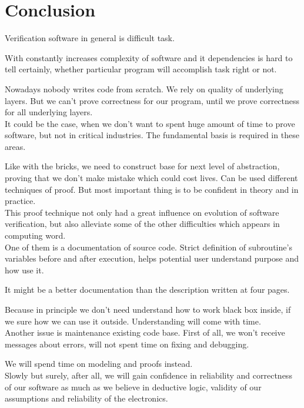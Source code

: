 \documentclass[twoside,twocolumn]{article}
\begin{document}

\section{Conclusion}

Verification software in general is difficult task.

With constantly increases complexity of software and it dependencies is hard to
tell certainly, whether particular program will accomplish task right or not. 

Nowadays nobody writes code from scratch. We rely on quality of underlying
layers. But we can't prove correctness for our program, until we prove
correctness for all underlying layers. \\

It could be the case, when we don't want to spent huge amount of time to prove
software, but not in critical industries. The fundamental basis is required in
these areas.

Like with the bricks, we need to construct base for next level of abstraction,
proving that we don't make mistake which could cost lives.
Can be used different techniques of proof. But most important thing is to be
confident in theory and in practice.
\\

This proof technique not only had a great influence on evolution of software
verification, but also alleviate some of the other difficulties which appears in 
computing word.\\

One of them is a documentation of source code.
Strict definition of subroutine's variables before and after execution, helps
potential user understand purpose and how use it.

It might be a better documentation than the description written at four pages.

Because in principle we don't need understand how to work black box inside, if
we sure how we can use it outside.
Understanding will come with time.
\\

Another issue is maintenance existing code base.
First of all, we won't receive messages about errors, will not spent time on
fixing and debugging. 

We will spend time on modeling and proofs instead.
\\

Slowly but surely, after all, we will gain confidence in reliability and
correctness of our software as much as we believe in deductive logic, validity
of our assumptions and reliability of the electronics.
\end{document}

